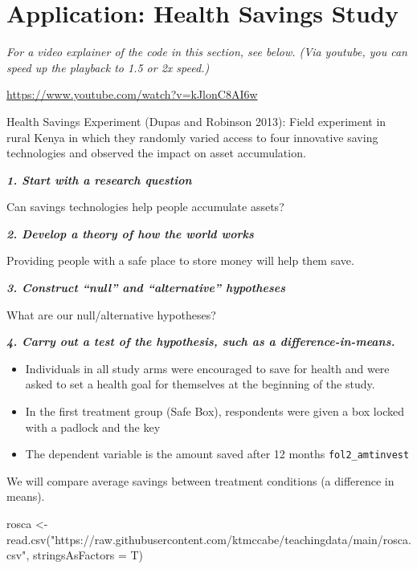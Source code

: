 \documentclass[
  letterpaper,
  DIV=11,
  numbers=noendperiod]{scrreprt}
\newenvironment{Shaded}{\begin{snugshade}}{\end{snugshade}}
\newcommand{\AttributeTok}[1]{\textcolor[rgb]{0.40,0.45,0.13}{#1}}
\newcommand{\FunctionTok}[1]{\textcolor[rgb]{0.28,0.35,0.67}{#1}}
\newcommand{\NormalTok}[1]{\textcolor[rgb]{0.00,0.23,0.31}{#1}}
\newcommand{\OtherTok}[1]{\textcolor[rgb]{0.00,0.23,0.31}{#1}}
\newcommand{\StringTok}[1]{\textcolor[rgb]{0.13,0.47,0.30}{#1}}
\providecommand{\tightlist}{%
  \setlength{\itemsep}{0pt}\setlength{\parskip}{0pt}}\usepackage{longtable,booktabs,array}
\begin{document}
\hypertarget{application-health-savings-study}{%
\section{Application: Health Savings
Study}\label{application-health-savings-study}}

\emph{For a video explainer of the code in this section, see below. (Via
youtube, you can speed up the playback to 1.5 or 2x speed.)}

\url{https://www.youtube.com/watch?v=kJlonC8AI6w}

Health Savings Experiment (Dupas and Robinson 2013): Field experiment in
rural Kenya in which they randomly varied access to four innovative
saving technologies and observed the impact on asset accumulation.

\textbf{\emph{1. Start with a research question}}

Can savings technologies help people accumulate assets?

\textbf{\emph{2. Develop a theory of how the world works}}

Providing people with a safe place to store money will help them save.

\textbf{\emph{3. Construct ``null'' and ``alternative'' hypotheses}}

What are our null/alternative hypotheses?

\textbf{\emph{4. Carry out a test of the hypothesis, such as a
difference-in-means.}}

\begin{itemize}
\tightlist
\item
  Individuals in all study arms were encouraged to save for health and
  were asked to set a health goal for themselves at the beginning of the
  study.\\
\item
  In the first treatment group (Safe Box), respondents were given a box
  locked with a padlock and the key
\item
  The dependent variable is the amount saved after 12 months
  \texttt{fol2\_amtinvest}
\end{itemize}

We will compare average savings between treatment conditions (a
difference in means).

\begin{Shaded}
\begin{Highlighting}[]
\NormalTok{rosca }\OtherTok{\textless{}{-}} \FunctionTok{read.csv}\NormalTok{(}\StringTok{"https://raw.githubusercontent.com/ktmccabe/teachingdata/main/rosca.csv"}\NormalTok{,}
                  \AttributeTok{stringsAsFactors =}\NormalTok{ T)}
\end{Highlighting}
\end{Shaded}
\end{document}
